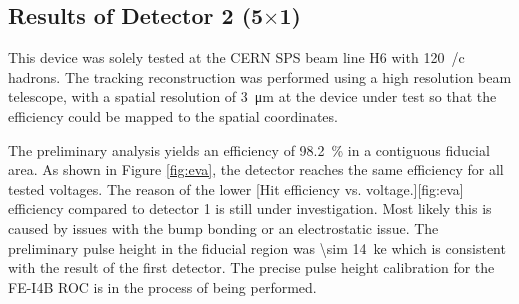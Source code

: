 \subsection{Results of Detector 2 (5$\times$1)}
This device was solely tested at the CERN SPS beam line H6 with \SI{120}{\gev/c} hadrons. The tracking reconstruction was performed using a high resolution beam telescope, with a spatial resolution of \SI{3}{\micro\meter} at the device under test so that the efficiency could be mapped to the spatial coordinates. \par
The preliminary analysis yields an efficiency of \SI{98.2}{\%} in a contiguous fiducial area. As shown in Figure \ref{fig:eva}, the detector reaches the same efficiency for all tested voltages. %
The reason of the lower 
[Hit efficiency vs. voltage.][fig:eva]
efficiency compared to detector 1 is still under investigation. Most likely this is caused by issues with the bump bonding or an electrostatic issue. The preliminary pulse height in the fiducial region was \SI{\sim 14}{\kilo e} which is consistent with the result of the first detector. The precise pulse height calibration for the FE-I4B \ac{ROC} is in the process of being performed.
